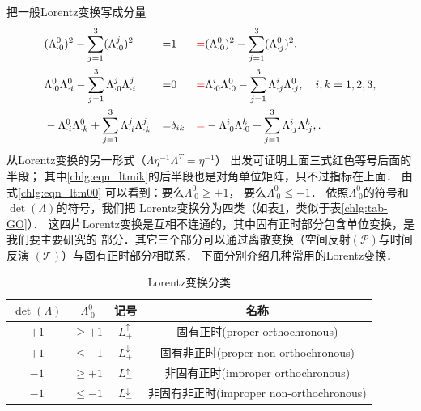 把一般Lorentz变换写成分量
\begin{align}
    & (\Lambda^{0}_{\cdot 0})^2 -\sum_{j=1}^{3} (\Lambda^{j}_{\cdot 0})^2 &= & 1
    &{\color{red} =}& (\Lambda^{0}_{\cdot 0})^2 -\sum_{j=1}^{3} ({\Lambda^0_{\cdot j}})^2 , \label{chlg:eqn_ltm00} \\
    & \Lambda^{0}_{\cdot 0} \Lambda^{0}_{\cdot i} - \sum_{j=1}^{3} \Lambda^{j}_{\cdot 0}
    \Lambda^{j}_{\cdot i} &= &0 &{\color{red} =}& \Lambda^{i}_{\cdot 0} \Lambda^{0}_{\cdot 0}
    - \sum_{j=1}^{3} \Lambda^{i}_{\cdot j}   \Lambda^{0}_{\cdot j},
    \quad i,k=1,2,3, \label{chlg:eqn_ltm0i}  \\
    & -\Lambda^{0}_{\cdot i} \Lambda^{0}_{\cdot k} + \sum_{j=1}^{3} \Lambda^{j}_{\cdot i}
    \Lambda^{j}_{\cdot k} &= &\delta_{ik} &{\color{red} =}& -\Lambda^{i}_{\cdot 0} \Lambda^{k}_{\cdot 0}
    + \sum_{j=1}^{3} \Lambda^{i}_{\cdot j}  \Lambda^{k}_{\cdot j},
    \label{chlg:eqn_ltmik} .
\end{align}
从Lorentz变换的另一形式（$\Lambda \eta^{-1}\Lambda ^T  =\eta^{-1}$）
出发可证明上面三式红色等号后面的半段；
其中\eqref{chlg:eqn_ltmik}的后半段也是对角单位矩阵，只不过指标在上面．
由式\eqref{chlg:eqn_ltm00} 可以看到：要么$\Lambda^{0}_{\cdot 0} \geqslant +1$，
要么$\Lambda^{0}_{\cdot 0} \leqslant -1$．
依照$\Lambda^{0}_{\cdot 0}$的符号和$\det(\Lambda)$的符号，我们把
Lorentz变换分为四类（如表\ref{chlg:tab_lorentz}，类似于表\ref{chlg:tab-GO}）．
这四片Lorentz变换是互相不连通的，其中固有正时部分包含单位变换，是我们要主要研究的
部分．其它三个部分可以通过离散变换（空间反射$(\mathcal{P})$与时间反演
$(\mathcal{T})$）与固有正时部分相联系．
下面分别介绍几种常用的Lorentz变换．


\begin{table}[!htb]
    \centering
    \caption{Lorentz变换分类} \label{chlg:tab_lorentz}
    \begin{tabular}{|c|c|c|c|}
        \hline
        $\det(\Lambda)$ & $\Lambda^{0}_{\cdot 0}$ & 记号 & 名称 \\ \hline
        $+1$ & $\geqslant +1$ &    $L^{\uparrow}_{+}$   & 固有正时(proper orthochronous) \\ \hline
        $+1$ & $\leqslant -1$ &    $L^{\downarrow}_{+}$ & 固有非正时(proper non-orthochronous) \\ \hline
        $-1$ & $\geqslant +1$ &    $L^{\uparrow}_{-}$   & 非固有正时(improper orthochronous) \\ \hline
        $-1$ & $\leqslant -1$ &    $L^{\downarrow}_{-}$ & 非固有非正时(improper non-orthochronous) \\ \hline
    \end{tabular}
\end{table}




